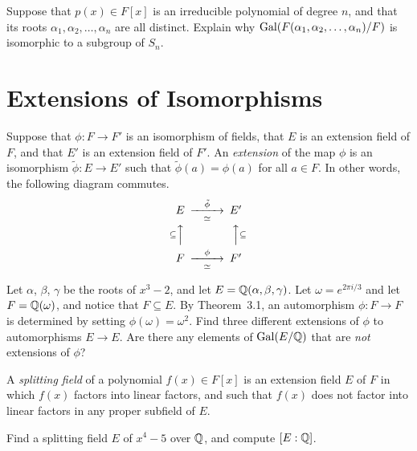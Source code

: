 \begin{problem}
    Suppose that $p(x)\in F[x]$ is an irreducible polynomial of degree $n$, and that its roots $\alpha_1,\alpha_2,\ldots,\alpha_n$ are all distinct. Explain why $\operatorname{Gal}(F(\alpha_1,\alpha_2,\ldots,\alpha_n)/F)$ is isomorphic to a subgroup of $S_n$.
\end{problem}


\section{Extensions of Isomorphisms}

\begin{definition}
    Suppose that $\phi:F \longrightarrow F'$ is an isomorphism of fields, that $E$ is an extension field of $F$, and that $E'$ is an extension field of $F'$. An \textit{extension} of the map $\phi$ is an isomorphism $\tilde{\phi}:E\longrightarrow E'$ such that $\tilde{\phi}(a)=\phi(a)$ for all $a\in F$. In other words, the following diagram commutes.
    $$
    \begin{CD}
        E              @>\tilde{\phi}>\simeq>   E' \\
        @A\subseteq AA                          @AA\subseteq A \\
        F              @>\phi>\simeq>           F'
    \end{CD}
    $$
\end{definition}

\begin{problem}\label{prob:3exts}
    Let $\alpha$, $\beta$, $\gamma$ be the roots of $x^3-2$, and let $E = \mathbb{Q}(\alpha,\beta,\gamma)$. Let $\omega = e^{2\pi i/3}$ and let $F=\mathbb{Q}(\omega)$, and notice that $F\subseteq E$. By Theorem~3.1, an automorphism $\phi:F\longrightarrow F$ is determined by setting $\phi(\omega)=\omega^2$. Find three different extensions of $\phi$ to automorphisms $E\longrightarrow E$. Are there any elements of $\operatorname{Gal}(E/\mathbb{Q})$ that are \textit{not} extensions of $\phi$?
\end{problem}



\begin{definition}
    A \textit{splitting field} of a polynomial $f(x)\in F[x]$ is an extension field $E$ of $F$ in which $f(x)$ factors into linear factors, and such that $f(x)$ does not factor into linear factors in any proper subfield of $E$.
\end{definition}

\begin{problem}
Find a splitting field $E$ of $x^4-5$ over $\mathbb{Q}$, and compute $[E:\mathbb{Q}]$.
\end{problem}



